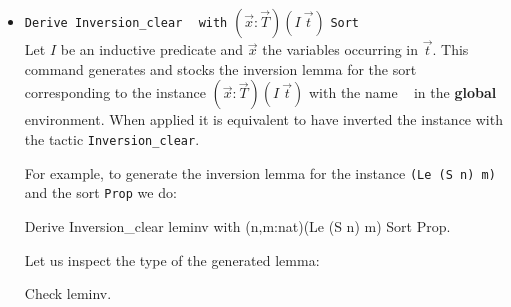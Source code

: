 \begin{itemize}

\item \texttt{Derive Inversion\_clear} \ident~ \texttt{with}
  $(\vec{x}:\vec{T})(I~\vec{t})$ \texttt{Sort} \sort~ \\ 
  Let $I$ be an inductive predicate and $\vec{x}$ the variables
  occurring in $\vec{t}$. This command generates and stocks
  the inversion lemma for the sort  \sort~  corresponding to the instance
  $(\vec{x}:\vec{T})(I~\vec{t})$ with the name \ident~ in the {\bf
    global} environment. When applied it is equivalent to have
  inverted the instance with the tactic {\tt Inversion\_clear}.


  For example, to generate the inversion lemma for the instance
 \texttt{(Le (S n) m)} and the sort \texttt{Prop} we do:
\begin{coq_example}
Derive Inversion_clear leminv with (n,m:nat)(Le (S n) m) Sort Prop.
\end{coq_example}

Let us  inspect the type of the generated lemma:
\begin{coq_example}
Check leminv.
\end{coq_example}



\end{itemize}

%



